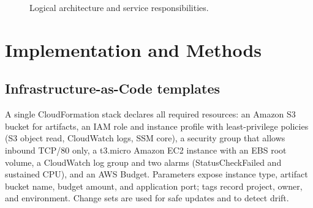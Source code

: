 \documentclass[12pt]{article}
\begin{document}
\begin{figure}[t]
\centering
{}
\caption{Logical architecture and service responsibilities.}
\label{fig:architecture}
\end{figure}

\clearpage
\section{Implementation and Methods}\label{sec:implementation}

\subsection{Infrastructure-as-Code templates}
A single CloudFormation stack declares all required resources: an Amazon S3 bucket for artifacts, an IAM role and instance profile with least-privilege policies (S3 object read, CloudWatch logs, SSM core), a security group that allows inbound TCP/80 only, a t3.micro Amazon EC2 instance with an EBS root volume, a CloudWatch log group and two alarms (StatusCheckFailed and sustained CPU), and an AWS Budget. Parameters expose instance type, artifact bucket name, budget amount, and application port; tags record project, owner, and environment. Change sets are used for safe updates and to detect drift.
\end{document}
